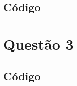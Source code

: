 \documentclass[12pt,a4paper,final]{article}
\begin{document}
\subsection*{Código}




\section{Questão 3}

\subsection{}

\subsection{}

\subsection*{Código}



\footnotesize{

}
\end{document}
